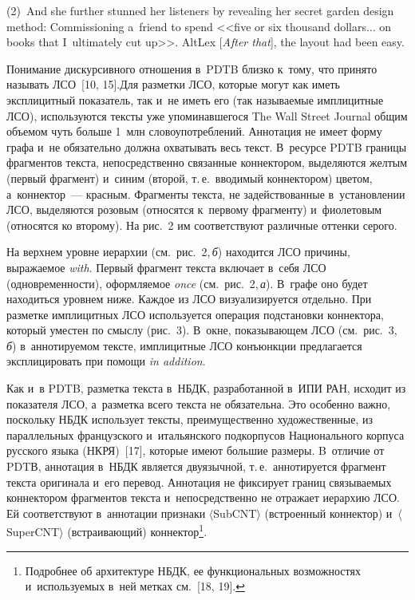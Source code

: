 \begin{multicols}{2}
\noindent
(2)~And she further stunned her listeners by revealing her secret garden design method: 
Commissioning a~friend to spend <<five or six thousand dollars$\ldots$ on books that 
I~ultimately cut up>>. AltLex [\textit{After that}], the layout had been easy.



    Понимание дискурсивного отношения в~PDTB близ\-ко к~тому, что принято 
называть ЛСО~[10, 15].\linebreak Для разметки ЛСО, 
которые могут как иметь эксплицитный показатель, так и~не иметь его (так 
на\-зы\-ва\-емые имплицитные ЛСО), используются текс\-ты уже упоминавшегося The 
Wall Street Journal\linebreak
 общим объемом чуть больше 1~млн сло\-во\-упо\-треб\-ле\-ний. 
Аннотация не имеет форму графа и~не обязательно должна охватывать весь текст. 
В~ресурсе PDTB границы фрагментов текс\-та, непосредственно связанные 
коннектором, выделяются жел\-тым (первый фрагмент) и~синим (второй, т.\,е.\ 
вводимый коннектором) цветом, а~коннектор~--- красным. Фрагменты текста, не 
задействованные в~установлении ЛСО, выделяются розовым (относятся к~первому 
фрагменту) и~фиолетовым (относятся ко второму). На рис.~2 им соответствуют 
различные оттенки серого.

    


На верхнем уровне иерархии (см.\ рис.~2,\,\textit{б}) находится ЛСО причины, 
выражаемое \textit{with}. Первый фрагмент текс\-та включает в~себя ЛСО 
(одновременности), оформляемое \textit{once} (см.\ рис.~2,\,\textit{а}). В~графе оно 
будет находиться уров\-нем ниже. Каждое из ЛСО визуализируется отдельно. При 
разметке имплицитных ЛСО используется операция под\-ста\-нов\-ки коннектора, 
который уместен по смыс\-лу (рис.~3). В~окне, по\-ка\-зы\-ва\-ющем ЛСО 
(см.\ рис.~3,\,\textit{б}) в~аннотируемом текс\-те, имплицитные ЛСО конъюнкции 
предлагается эксплицировать при помощи \textit{in addition}.




  Как и~в PDTB, разметка текста в~НБДК, разработанной в~ИПИ РАН, исходит из показателя ЛСО, а~разметка всего 
текста не обязательна. Это особенно важ\-но, поскольку НБДК использует текс\-ты, 
преимущественно художественные, из параллельных французского 
и~итальянского подкорпусов Национального корпуса русского языка 
(НКРЯ)~[17], которые имеют большие размеры. B~отличие от PDTВ, аннотация 
в~НБДК является двуязычной, т.\,е.\ аннотируется фрагмент текс\-та оригинала 
и~его перевод. Аннотация не фиксирует границ свя\-зы\-ва\-емых коннектором 
фрагментов текс\-та и~непосредственно не отражает иерархию ЛСО. Ей 
соответствуют в~аннотации признаки $\langle$SubCNT$\rangle$ (встроенный 
коннектор) и~$\langle$SuperCNT$\rangle$ (встраивающий) 
коннектор\footnote{Подробнее об архитектуре НБДК, ее функциональных 
возможностях и~ис\-поль\-зу\-емых в~ней мет\-ках см.~[18, 19].}. 
  

\end{multicols}
